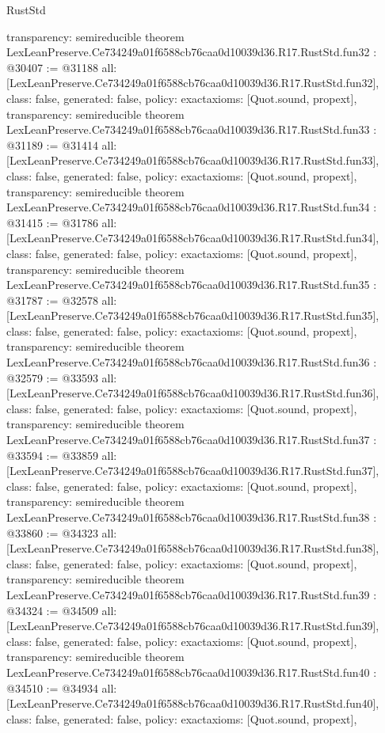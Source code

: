 \begin{lexlean}{RustStd}
\begin{coremodule}
{  transparency: semireducible
}
theorem LexLeanPreserve.Ce734249a01f6588cb76caa0d10039d36.R17.RustStd.fun32 : @30407 := @31188 {
  all: [LexLeanPreserve.Ce734249a01f6588cb76caa0d10039d36.R17.RustStd.fun32],
  class: false,
  generated: false,
  policy: exact{axioms: [Quot.sound, propext]},
  transparency: semireducible
}
theorem LexLeanPreserve.Ce734249a01f6588cb76caa0d10039d36.R17.RustStd.fun33 : @31189 := @31414 {
  all: [LexLeanPreserve.Ce734249a01f6588cb76caa0d10039d36.R17.RustStd.fun33],
  class: false,
  generated: false,
  policy: exact{axioms: [Quot.sound, propext]},
  transparency: semireducible
}
theorem LexLeanPreserve.Ce734249a01f6588cb76caa0d10039d36.R17.RustStd.fun34 : @31415 := @31786 {
  all: [LexLeanPreserve.Ce734249a01f6588cb76caa0d10039d36.R17.RustStd.fun34],
  class: false,
  generated: false,
  policy: exact{axioms: [Quot.sound, propext]},
  transparency: semireducible
}
theorem LexLeanPreserve.Ce734249a01f6588cb76caa0d10039d36.R17.RustStd.fun35 : @31787 := @32578 {
  all: [LexLeanPreserve.Ce734249a01f6588cb76caa0d10039d36.R17.RustStd.fun35],
  class: false,
  generated: false,
  policy: exact{axioms: [Quot.sound, propext]},
  transparency: semireducible
}
theorem LexLeanPreserve.Ce734249a01f6588cb76caa0d10039d36.R17.RustStd.fun36 : @32579 := @33593 {
  all: [LexLeanPreserve.Ce734249a01f6588cb76caa0d10039d36.R17.RustStd.fun36],
  class: false,
  generated: false,
  policy: exact{axioms: [Quot.sound, propext]},
  transparency: semireducible
}
theorem LexLeanPreserve.Ce734249a01f6588cb76caa0d10039d36.R17.RustStd.fun37 : @33594 := @33859 {
  all: [LexLeanPreserve.Ce734249a01f6588cb76caa0d10039d36.R17.RustStd.fun37],
  class: false,
  generated: false,
  policy: exact{axioms: [Quot.sound, propext]},
  transparency: semireducible
}
theorem LexLeanPreserve.Ce734249a01f6588cb76caa0d10039d36.R17.RustStd.fun38 : @33860 := @34323 {
  all: [LexLeanPreserve.Ce734249a01f6588cb76caa0d10039d36.R17.RustStd.fun38],
  class: false,
  generated: false,
  policy: exact{axioms: [Quot.sound, propext]},
  transparency: semireducible
}
theorem LexLeanPreserve.Ce734249a01f6588cb76caa0d10039d36.R17.RustStd.fun39 : @34324 := @34509 {
  all: [LexLeanPreserve.Ce734249a01f6588cb76caa0d10039d36.R17.RustStd.fun39],
  class: false,
  generated: false,
  policy: exact{axioms: [Quot.sound, propext]},
  transparency: semireducible
}
theorem LexLeanPreserve.Ce734249a01f6588cb76caa0d10039d36.R17.RustStd.fun40 : @34510 := @34934 {
  all: [LexLeanPreserve.Ce734249a01f6588cb76caa0d10039d36.R17.RustStd.fun40],
  class: false,
  generated: false,
  policy: exact{axioms: [Quot.sound, propext]},
}
\end{coremodule}
\end{lexlean}
